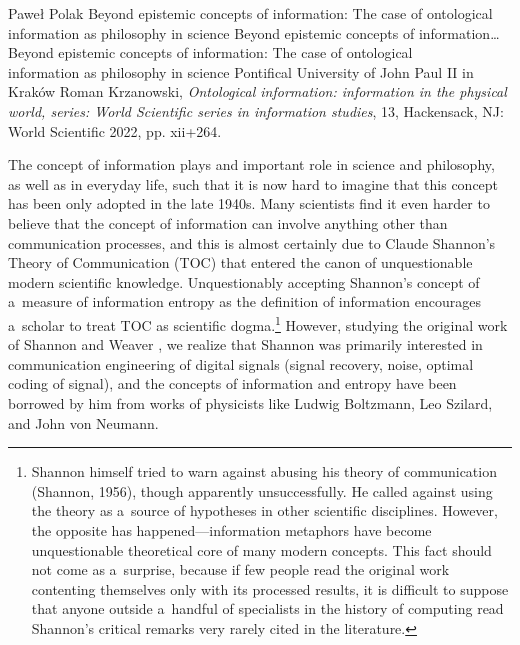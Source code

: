 \begin{newrevengenv}{Paweł Polak}
	{Beyond epistemic concepts of information: The case of ontological information as philosophy in science}
	{Beyond epistemic concepts of information\ldots}
	{Beyond epistemic concepts of information: The case of ontological\\information as philosophy in science}
	{Pontifical University of John Paul II in Kraków}
	{Roman Krzanowski, \textit{Ontological information: information in the physical world, series: World Scientific series in information studies}, 13, Hackensack, NJ: World Scientific 2022, pp. xii+264.}
	
	
	
%
%
%

\lettrine[loversize=0.13,lines=2,lraise=-0.03,nindent=0em,findent=0.2pt]%
{T}{}he concept of information plays and important role in science and philosophy, as well as in everyday life, such that it is now hard to imagine that this concept has been only adopted in the late 1940s. Many scientists find it even harder to believe that the concept of information can involve anything other than communication processes, and this is almost certainly due to Claude Shannon's Theory of Communication (TOC)
\parencite*[][]{shannon_mathematical_1949} %
 that entered the canon of unquestionable modern scientific knowledge. Unquestionably accepting Shannon's concept of a~measure of information entropy as the definition of information encourages a~scholar to treat TOC as scientific dogma.\footnote{ Shannon himself tried to warn against abusing his theory of communication (Shannon, 1956), though apparently unsuccessfully. He called against using the theory as a~source of hypotheses in other scientific disciplines. However, the opposite has happened—information metaphors have become unquestionable theoretical core of many modern concepts. This fact should not come as a~surprise, because if few people read the original work contenting themselves only with its processed results, it is difficult to suppose that anyone outside a~handful of specialists in the history of computing read Shannon's critical remarks very rarely cited in the literature.} However, studying the original work of Shannon and Weaver 
\parencite*[][p.3]{shannon_mathematical_1964}, %
 we realize that Shannon was primarily interested in communication engineering of digital signals (signal recovery, noise, optimal coding of signal), and the concepts of information and entropy have been borrowed by him from works of physicists like Ludwig Boltzmann, Leo Szilard, and John von Neumann.


\end{newrevengenv}
